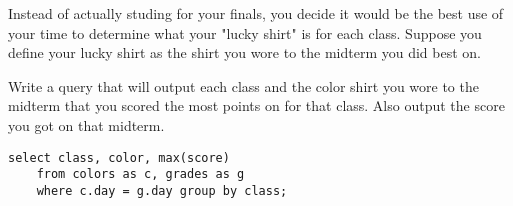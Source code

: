 \begin{blocksection}
\question 
Instead of actually studing for your finals, you decide it would be the best use of your time to determine what your "lucky shirt" is for each class. Suppose you define your lucky shirt as the shirt you wore to the midterm you did best on.

Write a query that will output each class and the color shirt you wore to the midterm that you scored the most points on for that class. Also output the score you got on that midterm.

\begin{solution}[1.5in]
\begin{lstlisting}
select class, color, max(score)
    from colors as c, grades as g
    where c.day = g.day group by class;
\end{lstlisting}
\end{solution}
\end{blocksection}